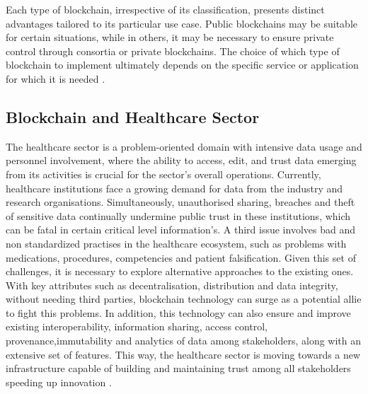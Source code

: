 Each type of blockchain, irrespective of its classification, presents distinct advantages 
tailored to its particular use case. Public blockchains may be suitable for certain situations, 
while in others, it may be necessary to ensure private control through consortia or private blockchains.
The choice of which type of blockchain to implement ultimately depends on the specific service or application 
for which it is needed \cite{private-vs-public-vs-consortium}.

\subsection{Blockchain and Healthcare Sector}
The healthcare sector is a problem-oriented domain with intensive data usage and personnel
involvement, where the ability to access, edit, and trust data emerging from its activities 
is crucial for the sector's overall operations. Currently, healthcare institutions face a growing 
demand for data from the industry and research organisations. Simultaneously, unauthorised sharing, 
breaches and theft of sensitive data continually undermine public trust in these institutions, which 
can be fatal in certain critical level information's. A third issue involves bad and non standardized 
practises in the healthcare ecosystem, such as problems with medications, procedures, 
competencies and patient falsification. Given this set of challenges, it is necessary to 
explore alternative approaches to the existing ones. With key attributes such as decentralisation, 
distribution and data integrity, without needing third parties, blockchain technology can surge 
as a potential allie to fight this problems. In addition, this technology can also ensure and 
improve existing interoperability, information sharing, access control, provenance,immutability 
and analytics of data among stakeholders, along with an extensive set of features. This way, the 
healthcare sector is moving towards a new infrastructure capable of building and maintaining 
trust among all stakeholders speeding up innovation \cite{systematic-review-of-blockchain} \cite{healthcare-theft-data}.

